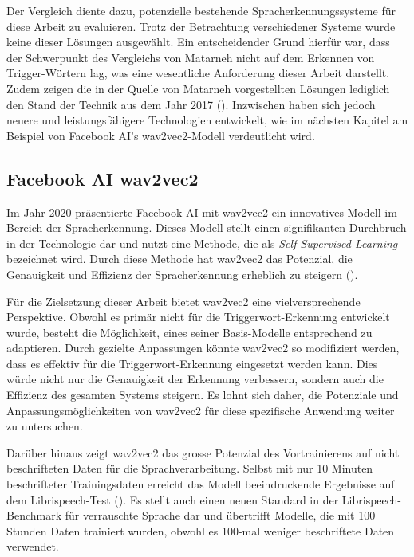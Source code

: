 \documentclass[11pt,a4paper]{article}
\begin{document}
\noindent
Der Vergleich diente dazu, potenzielle bestehende Spracherkennungssysteme für diese Arbeit zu 
evaluieren. Trotz der Betrachtung verschiedener Systeme wurde keine dieser Lösungen ausgewählt. Ein 
entscheidender Grund hierfür war, dass der Schwerpunkt des Vergleichs von Matarneh nicht auf dem 
Erkennen von Trigger-Wörtern lag, was eine wesentliche Anforderung dieser Arbeit darstellt. Zudem 
zeigen die in der Quelle von Matarneh vorgestellten Lösungen lediglich den Stand der Technik aus 
dem Jahr 2017 (\cite{matarneh2017speechrecognition}). Inzwischen haben sich jedoch neuere und 
leistungsfähigere Technologien entwickelt, wie im nächsten Kapitel am Beispiel von Facebook AI's 
wav2vec2-Modell verdeutlicht wird.

\subsection{Facebook AI wav2vec2}

Im Jahr 2020 präsentierte Facebook AI mit wav2vec2 ein innovatives Modell im Bereich der 
Spracherkennung. Dieses Modell stellt einen signifikanten Durchbruch in der Technologie dar und 
nutzt eine Methode, die als \textit{Self-Supervised Learning} bezeichnet wird. Durch diese Methode 
hat wav2vec2 das Potenzial, die Genauigkeit und Effizienz der Spracherkennung erheblich zu steigern 
(\cite{baevski2020wav2vec}).

\noindent \newline
Für die Zielsetzung dieser Arbeit bietet wav2vec2 eine vielversprechende Perspektive. Obwohl es 
primär nicht für die Triggerwort-Erkennung entwickelt wurde, besteht die Möglichkeit, eines seiner 
Basis-Modelle entsprechend zu adaptieren. Durch gezielte Anpassungen könnte wav2vec2 so modifiziert 
werden, dass es effektiv für die Triggerwort-Erkennung eingesetzt werden kann. Dies würde nicht nur 
die Genauigkeit der Erkennung verbessern, sondern auch die Effizienz des gesamten Systems steigern. 
Es lohnt sich daher, die Potenziale und Anpassungsmöglichkeiten von wav2vec2 für diese spezifische 
Anwendung weiter zu untersuchen.

\noindent \newline
Darüber hinaus zeigt wav2vec2 das grosse Potenzial des Vortrainierens auf nicht beschrifteten 
Daten für die Sprachverarbeitung. Selbst mit nur 10 Minuten beschrifteter Trainingsdaten erreicht 
das Modell beeindruckende Ergebnisse auf dem Librispeech-Test (\cite{baevski2020wav2vec}). Es stellt 
auch einen neuen Standard in der Librispeech-Benchmark für verrauschte Sprache dar und übertrifft 
Modelle, die mit 100 Stunden Daten trainiert wurden, obwohl es 100-mal weniger beschriftete Daten 
verwendet.
\end{document}
